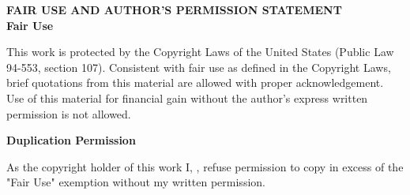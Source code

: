 \thispagestyle{empty}

\singlespacing

\begin{center}

    \textbf{FAIR USE AND AUTHOR'S PERMISSION STATEMENT} \\[2em]
    \textbf{Fair Use} 
\end{center}
\begin{flushleft}

This work is protected by the Copyright Laws of the United States (Public Law 94-553, section 107). Consistent with fair use as defined in the Copyright Laws, brief quotations from this material are allowed with proper acknowledgement. Use of this material for financial gain without the author's express written permission is not allowed. \\[2em]

\end{flushleft}
\begin{center}
    \textbf{Duplication Permission} 
\end{center}

\begin{flushleft}
    As the copyright holder of this work I, \myName, refuse permission to copy in excess of the "Fair Use" exemption without my written permission.
    \vfill
\end{flushleft}

\doublespacing
